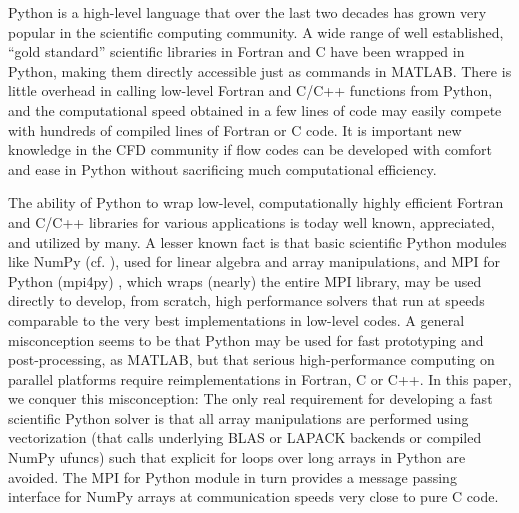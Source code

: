 \documentclass[final,3p,times,twocolumn]{elsarticle}
\begin{document}

Python is a high-level language that over the last two decades has grown very 
popular in the scientific computing community. A wide range of well 
established, ``gold standard'' scientific libraries in Fortran and C have been 
wrapped in Python, making them directly accessible just as commands in MATLAB. 
There is little overhead in calling low-level Fortran and C/C++ functions from 
Python, and the computational speed obtained in a few lines of code may easily 
compete with hundreds of compiled lines of Fortran or C code. It is important 
new knowledge in the CFD community if flow codes can be developed with comfort 
and ease in Python without sacrificing much computational efficiency.

The ability of Python to wrap low-level, computationally highly efficient 
Fortran and C/C++ libraries for various applications is today well known, 
appreciated, and utilized by many. A lesser known fact is that basic scientific 
Python modules like NumPy (cf. \cite{numpy, van2011numpy}), used for linear 
algebra and array manipulations, and MPI for Python (mpi4py) \cite{mpi4py}, 
which wraps (nearly) the entire MPI library, may be used directly to develop, 
from scratch, 
high performance solvers that run at speeds comparable to the very best 
implementations in low-level codes. A general misconception seems to be that 
Python may be used for fast prototyping and post-processing, as MATLAB, but 
that serious high-performance computing on parallel platforms require 
reimplementations in Fortran, C or C++. In this paper, we conquer this 
misconception: The only real requirement for developing a fast scientific 
Python solver is that all array manipulations are 
performed using vectorization (that calls underlying BLAS or LAPACK backends or 
compiled NumPy ufuncs) such that explicit for loops over long arrays in Python 
are avoided. The MPI for Python module in turn provides a message passing 
interface for NumPy arrays at communication speeds very close to pure 
C code.
\end{document}
